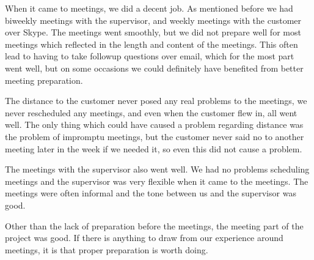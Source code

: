 When it came to meetings, we did a decent job. As mentioned before we had biweekly meetings with the supervisor, and weekly meetings with the customer over Skype. The meetings went smoothly, but we did not prepare well for most meetings which reflected in the length and content of the meetings. This often lead to having to take followup questions over email, which for the most part went well, but on some occasions we could definitely have benefited from better meeting preparation.

The distance to the customer never posed any real problems to the meetings, we never rescheduled any meetings, and even when the customer flew in, all went well. The only thing which could have caused a problem regarding distance was the problem of impromptu meetings, but the customer never said no to another meeting later in the week if we needed it, so even this did not cause a problem. 

The meetings with the supervisor also went well. We had no problems scheduling meetings and the supervisor was very flexible when it came to the meetings. The meetings were often informal and the tone between us and the supervisor was good.

Other than the lack of preparation before the meetings, the meeting part of the project was good. If there is anything to draw from our experience around meetings, it is that proper preparation is worth doing.
